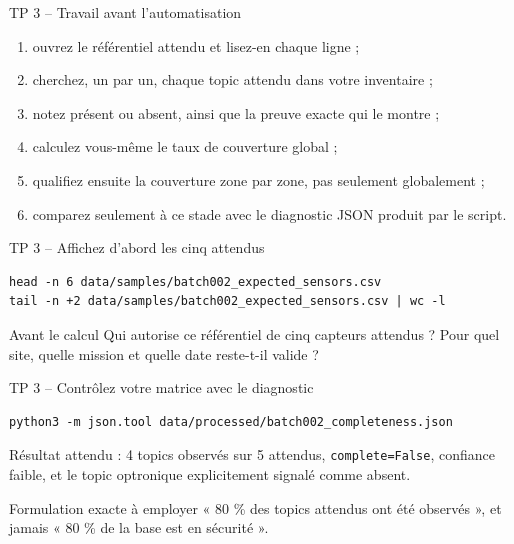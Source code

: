 \documentclass[aspectratio=169]{beamer}
\begin{document}
\begin{frame}{TP 3 -- Travail avant l'automatisation}
\begin{enumerate}
\item ouvrez le référentiel attendu et lisez-en chaque ligne ;
\item cherchez, un par un, chaque topic attendu dans votre inventaire ;
\item notez présent ou absent, ainsi que la preuve exacte qui le montre ;
\item calculez vous-même le taux de couverture global ;
\item qualifiez ensuite la couverture zone par zone, pas seulement globalement ;
\item comparez seulement à ce stade avec le diagnostic JSON produit par le script.
\end{enumerate}
\end{frame}

\begin{frame}[fragile]{TP 3 -- Affichez d'abord les cinq attendus}
\small
\begin{verbatim}
head -n 6 data/samples/batch002_expected_sensors.csv
tail -n +2 data/samples/batch002_expected_sensors.csv | wc -l
\end{verbatim}
\begin{block}{Avant le calcul}
Qui autorise ce référentiel de cinq capteurs attendus ? Pour quel site, quelle mission et quelle date reste-t-il valide ?
\end{block}
\end{frame}

\begin{frame}[fragile]{TP 3 -- Contrôlez votre matrice avec le diagnostic}
\small
\begin{verbatim}
python3 -m json.tool data/processed/batch002_completeness.json
\end{verbatim}
Résultat attendu : 4 topics observés sur 5 attendus, \texttt{complete=False}, confiance faible, et le topic optronique explicitement signalé comme absent.
\begin{alertblock}{Formulation exacte à employer}
« 80 \% des topics attendus ont été observés », et jamais « 80 \% de la base est en sécurité ».
\end{alertblock}
\end{frame}
\end{document}

